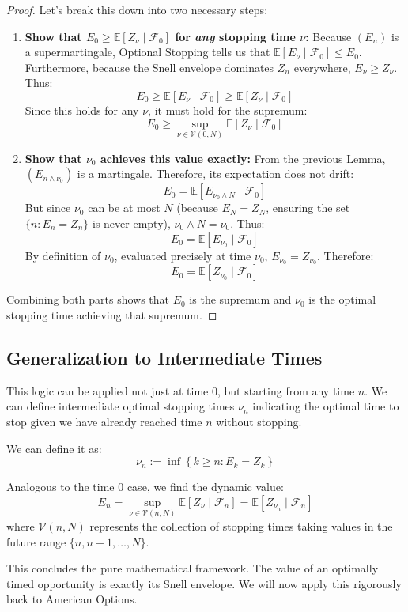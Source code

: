 \begin{proof}
Let's break this down into two necessary steps:
\begin{enumerate}
    \item \textbf{Show that $E_0 \geq \mathbb{E}[Z_\nu \mid \mathcal{F}_0]$ for \textit{any} stopping time $\nu$:}
    Because $(E_n)$ is a supermartingale, Optional Stopping tells us that $\mathbb{E}[E_\nu \mid \mathcal{F}_0] \leq E_0$. 
    Furthermore, because the Snell envelope dominates $Z_n$ everywhere, $E_\nu \geq Z_\nu$. 
    Thus:
    $$ E_0 \geq \mathbb{E}[E_\nu \mid \mathcal{F}_0] \geq \mathbb{E}[Z_\nu \mid \mathcal{F}_0] $$
    Since this holds for any $\nu$, it must hold for the supremum:
    $$ E_0 \geq \sup_{\nu \in \mathcal{V}(0,N)} \mathbb{E}[ Z_\nu \mid \mathcal{F}_0 ] $$
    
    \item \textbf{Show that $\nu_0$ achieves this value exactly:}
    From the previous Lemma, $(E_{n \wedge \nu_0})$ is a martingale. Therefore, its expectation does not drift:
    $$ E_0 = \mathbb{E}[E_{\nu_0 \wedge N} \mid \mathcal{F}_0] $$
    But since $\nu_0$ can be at most $N$ (because $E_N = Z_N$, ensuring the set $\{n: E_n = Z_n\}$ is never empty), $\nu_0 \wedge N = \nu_0$.
    Thus:
    $$ E_0 = \mathbb{E}[E_{\nu_0} \mid \mathcal{F}_0] $$
    By definition of $\nu_0$, evaluated precisely at time $\nu_0$, $E_{\nu_0} = Z_{\nu_0}$. Therefore:
    $$ E_0 = \mathbb{E}[Z_{\nu_0} \mid \mathcal{F}_0] $$
\end{enumerate}
Combining both parts shows that $E_0$ is the supremum and $\nu_0$ is the optimal stopping time achieving that supremum.
\end{proof}

\subsection{Generalization to Intermediate Times}

This logic can be applied not just at time 0, but starting from any time $n$. We can define intermediate optimal stopping times $\nu_n$ indicating the optimal time to stop given we have already reached time $n$ without stopping.

We can define it as:
$$ \nu_n := \inf \left\{ k \geq n : E_k = Z_k \right\} $$

Analogous to the time 0 case, we find the dynamic value:
$$ E_n = \sup_{\nu \in \mathcal{V}(n,N)} \mathbb{E}\left[ Z_\nu \mid \mathcal{F}_n \right] = \mathbb{E}\left[ Z_{\nu_n} \mid \mathcal{F}_n \right] $$
where $\mathcal{V}(n, N)$ represents the collection of stopping times taking values in the future range $\{n, n+1, \ldots, N\}$.

This concludes the pure mathematical framework. The value of an optimally timed opportunity is exactly its Snell envelope. We will now apply this rigorously back to American Options.
